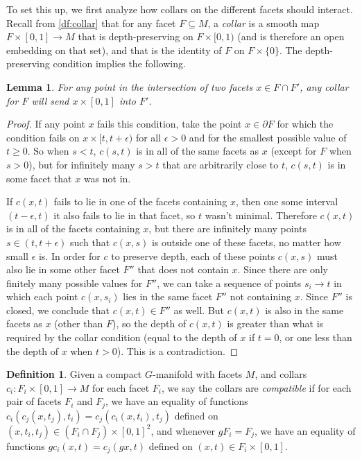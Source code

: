\documentclass[11pt]{amsart}
\newtheorem{lem}{Lemma}[section]
\theoremstyle{definition}
\newtheorem{defn}{Definition}[section]
\numberwithin{equation}{section}
\numberwithin{figure}{section}
\newcommand{\ourdefn}[1]{{\it #1}}
\begin{document}
To set this up, we first analyze how collars on the different facets should interact. Recall from \autoref{df:collar} that for any facet $F \subseteq M$, a \ourdefn{collar} is a smooth map $F \times [0,1] \to M$ that is depth-preserving on $F \times [0,1)$ (and is therefore an open embedding on that set), and that is the identity of $F$ on $F \times \{0\}$. The depth-preserving condition implies the following.
\begin{lem}
	For any point in the intersection of two facets $x\in F \cap F'$, any collar for $F$ will send $x \times [0,1]$ into $F'$.
\end{lem}

\begin{proof}
	If any point $x$ fails this condition, take the point $x \in \partial F$ for which the condition fails on $x \times [t,t+\epsilon)$ for all $\epsilon > 0$ and for the smallest possible value of $t \geq 0$. So when $s < t$, $c(s,t)$ is in all of the same facets as $x$ (except for $F$ when $s > 0$), but for infinitely many $s > t$ that are arbitrarily close to $t$, $c(s,t)$ is in some facet that $x$ was not in.
	
	If $c(x,t)$ fails to lie in one of the facets containing $x$, then one some interval $(t-\epsilon,t)$ it also fails to lie in that facet, so $t$ wasn't minimal. Therefore $c(x,t)$ is in all of the facets containing $x$, but there are infinitely many points $s \in (t,t+\epsilon)$ such that $c(x,s)$ is outside one of these facets, no matter how small $\epsilon$ is. In order for $c$ to preserve depth, each of these points $c(x,s)$ must also lie in some other facet $F''$ that does not contain $x$. Since there are only finitely many possible values for $F''$, we can take a sequence of points $s_i \to t$ in which each point $c(x,s_i)$ lies in the same facet $F''$ not containing $x$. Since $F''$ is closed, we conclude that $c(x,t) \in F''$ as well. But $c(x,t)$ is also in the same facets as $x$ (other than $F$), so the depth of $c(x,t)$ is greater than what is required by the collar condition (equal to the depth of $x$ if $t = 0$, or one less than the depth of $x$ when $t > 0$). This is a contradiction.
\end{proof}

\begin{defn}\label{df:collars_compatible}
	Given a compact $G$-manifold with facets $M$, and collars $c_i\colon F_i \times [0,1] \to M$ for each facet $F_i$, we say the collars are \ourdefn{compatible} if for each pair of facets $F_i$ and $F_j$, we have an equality of functions $c_i(c_j(x,t_j),t_i) = c_j(c_i(x,t_i),t_j)$ defined on $(x,t_i,t_j) \in (F_i \cap F_j) \times [0,1]^2$, 
and whenever $gF_i = F_j$, we have an equality of functions $gc_i(x,t) = c_j(gx,t)$ defined on $(x,t) \in F_i \times [0,1]$.
\end{defn}
\end{document}
